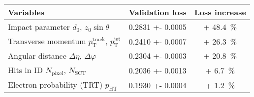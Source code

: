 \begin{tabular}{p{5cm}S[table-format=1.4(4)]S[retain-explicit-plus, table-format=+2.1]}
  \toprule
  {Variables} & {Validation loss} & {Loss increase} \\
  \midrule
  \parbox[c]{\hsize}{Impact parameter \newline $d_0$, $z_0 \sin\theta$}
          & 0.2831 +- 0.0005 & + 48.4 \,\si{\percent} \\[1.2em]
  \parbox[c]{\hsize}{Transverse momentum \newline $p_\text{T}^\text{track}$, $p_\text{T}^\text{jet}$}
          & 0.2410 +- 0.0007 & + 26.3 \,\si{\percent} \\[1.2em]
  \parbox[c]{\hsize}{Angular distance \newline $\Delta \eta$, $\Delta \varphi$}
          & 0.2304 +- 0.0003 & + 20.8 \,\si{\percent} \\[1.2em]
  \parbox[c]{\hsize}{Hits in ID \newline $N_\text{pixel}$, $N_\text{SCT}$}
          & 0.2036 +- 0.0013 & + 6.7 \,\si{\percent} \\[1.2em]
  \parbox[c]{\hsize}{Electron probability (TRT) \newline $p_\text{HT}$}
          & 0.1930 +- 0.0004 & + 1.2 \,\si{\percent}\\
  \bottomrule
\end{tabular}

